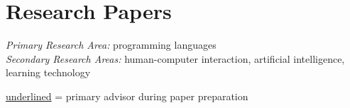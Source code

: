 \documentclass[10pt,letterpaper]{article}
\begin{document}
\section*{Research Papers}

\textit{Primary Research Area:} programming languages \\
\textit{Secondary Research Areas:} human-computer interaction, artificial intelligence, learning technology

\newcommand{\advisee}[1]{\underline{\smash{#1}}}
\underline{underlined} = primary advisor during paper preparation

\end{document}
